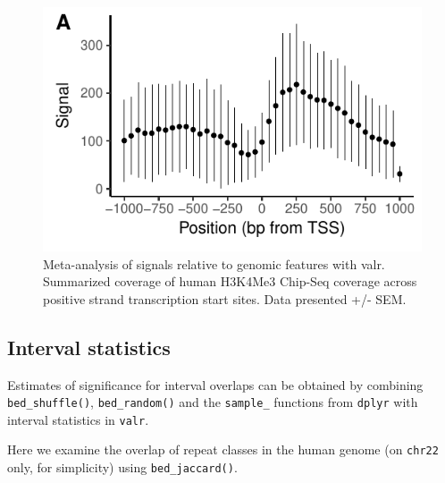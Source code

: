 \documentclass[9pt,a4paper]{extarticle}
\begin{document}
\begin{figure}[!htb]
\centering
\includegraphics[width=\textwidth]{tss.pdf}
\caption{\label{fig:Figure 2}Meta-analysis of signals relative to genomic features with valr. \textnormal{Summarized coverage of human H3K4Me3 Chip-Seq coverage across positive strand transcription start sites. Data presented +/- SEM.}}
\end{figure}


\subsection*{Interval statistics}\label{interval-statistics}

Estimates of significance for interval overlaps can be obtained by
combining \texttt{bed\_shuffle()}, \texttt{bed\_random()} and the
\texttt{sample\_} functions from \texttt{dplyr} with interval statistics
in \texttt{valr}.

Here we examine the overlap of repeat classes in the human genome (on
\texttt{chr22} only, for simplicity) using \texttt{bed\_jaccard()}.
\end{document}
